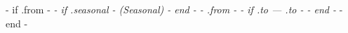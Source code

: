 {{- if .from -}}
	\dotfill \textit{
	{{- if .seasonal -}}
		\textcolor{accent}{ \small{(\textit{Seasonal})} }
	{{- end -}}
	\textcolor{accent}{ {{- .from -}} }
	{{- if .to }} \textcolor{accent}{--- {{ .to -}} } {{- end -}}
	}
{{- end -}}